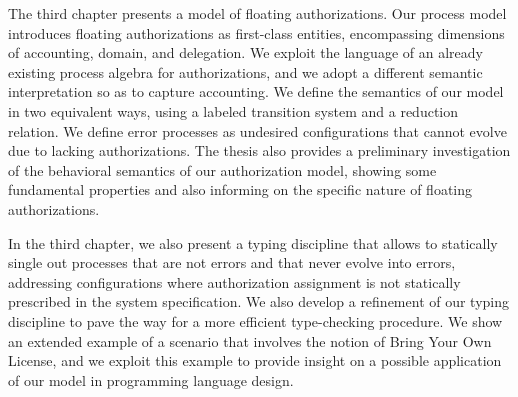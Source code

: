 The third chapter presents a model of floating authorizations. Our process model introduces floating authorizations as first-class entities, encompassing dimensions of accounting, domain, and delegation. 
We exploit the language of an already existing process algebra for authorizations, and we adopt a different semantic interpretation so as to capture accounting. We define the semantics of our model in two equivalent ways, using a labeled transition system and a reduction relation. %
We define error processes as undesired configurations that cannot evolve due to lacking authorizations. %
The thesis also provides a preliminary investigation of the behavioral semantics of our authorization model, showing some fundamental properties and also informing on the specific nature of floating authorizations. %

In the third chapter, we also  present a typing discipline that allows to statically single out processes that are not errors and that never evolve into errors, addressing configurations where authorization assignment
is not statically prescribed in the system specification. %
We also develop a refinement of our typing discipline to pave the way for a more efficient type-checking procedure. %
We show an extended example of a scenario that involves the notion of Bring Your Own License, and we exploit this example to provide insight on a possible application of our model in programming language design.